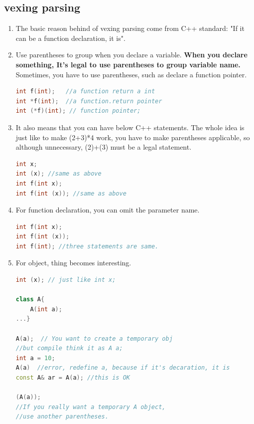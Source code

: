 \documentclass[a4paper,11pt,twoside]{book}
\begin{document}
\subsection{vexing parsing}
\begin{enumerate}
	\item The basic reason behind of vexing parsing come from C++ standard: "If it can be a function declaration, it is".
	
	\item Use parentheses to group when you declare a variable. \textbf{When you declare something, It's legal to use parentheses to group variable name.} Sometimes, you have to use parentheses, such as declare a function pointer. 
\begin{lstlisting}[frame=single, language=c++, mathescape=true]
int f(int);   //a function return a int
int *f(int);  //a function.return pointer
int (*f)(int); // function pointer;  
\end{lstlisting}
	
	\item It also means that you can have below C++ statements. The whole idea is just like to make (2+3)*4 work, you have to make parentheses applicable, so although unnecessary, (2)+(3) must be a legal statement.
\begin{lstlisting}[frame=single, language=c++, mathescape=true]
int x;
int (x); //same as above
int f(int x);
int f(int (x)); //same as above
\end{lstlisting}
	
	\item For function declaration, you can omit the parameter name.  
\begin{lstlisting}[frame=single, language=c++, mathescape=true]
int f(int x);
int f(int (x));
int f(int); //three statements are same. 
\end{lstlisting}
	
	\item For object, thing becomes interesting.
\begin{lstlisting}[frame=single, language=c++, mathescape=true]
int (x); // just like int x;

class A{
	A(int a);
...}
	
A(a);  // You want to create a temporary obj
//but compile think it as A a;
int a = 10;
A(a)  //error, redefine a, because if it's decaration, it is
const A& ar = A(a); //this is OK

(A(a)); 
//If you really want a temporary A object,
//use another parentheses. 
\end{lstlisting}
	

\end{enumerate}
\end{document}
